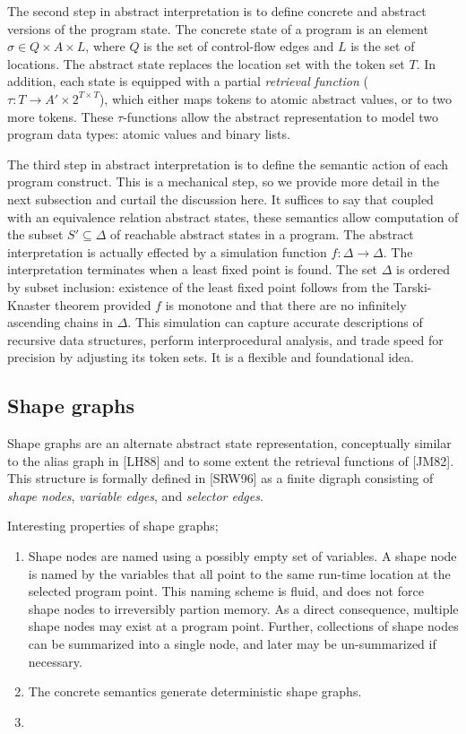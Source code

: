 \documentclass{article}
\begin{document}
The second step in abstract interpretation is to define concrete and
abstract versions of the program state.  The concrete state of a program is
an element $\sigma \in Q \times A \times L$, where $Q$ is the set of
control-flow edges and $L$ is the set of locations. The abstract state
replaces the location set with the token set $T$. In addition, each state is
equipped with a partial \textit{retrieval function} ($\tau : T \rightarrow
A' \times 2^{T \times T}$), which either maps tokens to atomic abstract
values, or to two more tokens. These $\tau$-functions allow the abstract
representation to model two program data types: atomic values and binary
lists.

The third step in abstract interpretation is to define the semantic action
of each program construct. This is a mechanical step, so we provide more
detail in the next subsection and curtail the discussion here. It suffices
to say that coupled with an equivalence relation abstract states, these
semantics allow computation of the subset $S' \subseteq \Delta$ of reachable
abstract states in a program. The abstract interpretation is actually
effected by a simulation function $f : \Delta \rightarrow \Delta$. The
interpretation terminates when a least fixed point is found. The set
$\Delta$ is ordered by subset inclusion: existence of the least fixed point
follows from the Tarski-Knaster theorem provided $f$ is monotone and that
there are no infinitely ascending chains in $\Delta$. This simulation can
capture accurate descriptions of recursive data structures, perform
interprocedural analysis, and trade speed for precision by adjusting its
token sets. It is a flexible and foundational idea.

\subsection{Shape graphs}

Shape graphs are an alternate abstract state representation, conceptually
similar to the alias graph in [LH88] and to some extent the retrieval
functions of [JM82]. This structure is formally defined in [SRW96] as a
finite digraph consisting of \textit{shape nodes}, \textit{variable edges},
and \textit{selector edges}.

Interesting properties of shape graphs;
\begin{enumerate}[1.]
    \item Shape nodes are named using a possibly empty set of variables. A
        shape node is named by the variables that all point to the same
        run-time location at the selected program point. This naming scheme
        is fluid, and does not force shape nodes to irreversibly partion
        memory. As a direct consequence, multiple shape nodes may exist at
        a program point. Further, collections of shape nodes can be
        summarized into a single node, and later may be un-summarized if
        necessary.

    \item The concrete semantics generate deterministic shape graphs.
    \item 
\end{enumerate}
\end{document}
